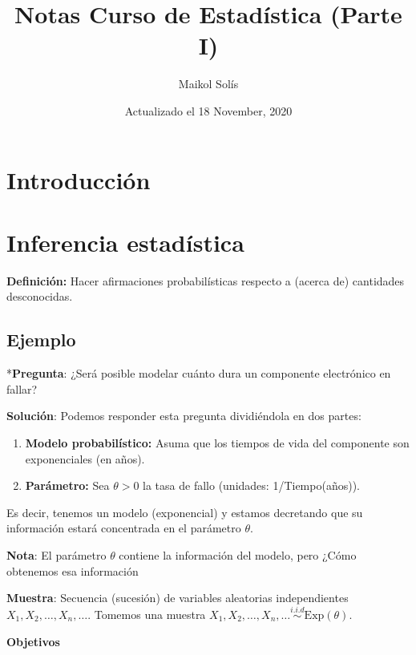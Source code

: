 \documentclass[
  12pt,
]{book}
\title{Notas Curso de Estadística (Parte I)}
\author{Maikol Solís}
\date{Actualizado el 18 November, 2020}
\providecommand{\tightlist}{%
  \setlength{\itemsep}{0pt}\setlength{\parskip}{0pt}}
\begin{document}
\maketitle

{
\hypersetup{linkcolor=}
\setcounter{tocdepth}{4}
\tableofcontents
}
\hypertarget{introducciuxf3n}{%
\chapter{Introducción}\label{introducciuxf3n}}

\hypertarget{inferencia-estaduxedstica}{%
\chapter{Inferencia estadística}\label{inferencia-estaduxedstica}}

\textbf{Definición:} Hacer afirmaciones probabilísticas respecto a (acerca de)
cantidades desconocidas.

\hypertarget{ejemplo}{%
\section{Ejemplo}\label{ejemplo}}

*\textbf{Pregunta}: ¿Será posible modelar cuánto dura un componente electrónico en
fallar?

\textbf{Solución}: Podemos responder esta pregunta dividiéndola en dos partes:

\begin{enumerate}
\def\labelenumi{\arabic{enumi}.}
\tightlist
\item
  \textbf{Modelo probabilístico:} Asuma que los tiempos de vida del componente son
  exponenciales (en años).
\item
  \textbf{Parámetro:} Sea \(\theta > 0\) la tasa de fallo (unidades: 1/Tiempo(años)).
\end{enumerate}

Es decir, tenemos un modelo (exponencial) y estamos decretando que su información estará concentrada en el parámetro \(\theta\).

\textbf{Nota}: El parámetro \(\theta\) contiene la información del modelo,
pero ¿Cómo obtenemos esa información

\textbf{Muestra}: Secuencia (sucesión) de variables aleatorias independientes \(X_1,X_2,\dots, X_n,\dots\). Tomemos una muestra \(X_1,X_2,\dots, X_n,\dots \stackrel{i.i.d}{\sim} \text{Exp}(\theta)\).

\textbf{Objetivos}
\end{document}
